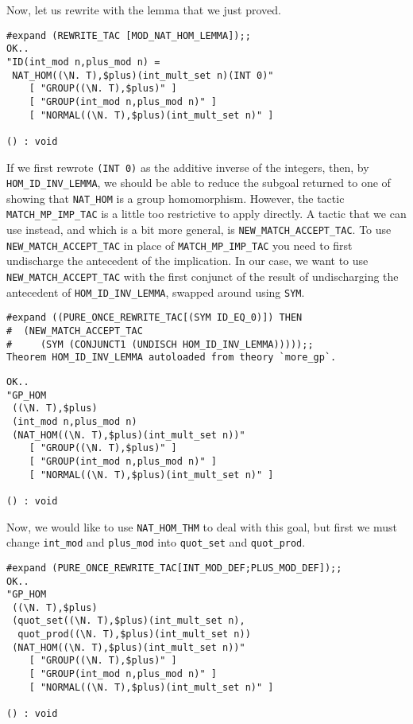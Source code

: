 Now, let us rewrite with the lemma that we just proved.
\begin{session}
\begin{verbatim}
#expand (REWRITE_TAC [MOD_NAT_HOM_LEMMA]);;
OK..
"ID(int_mod n,plus_mod n) =
 NAT_HOM((\N. T),$plus)(int_mult_set n)(INT 0)"
    [ "GROUP((\N. T),$plus)" ]
    [ "GROUP(int_mod n,plus_mod n)" ]
    [ "NORMAL((\N. T),$plus)(int_mult_set n)" ]

() : void
\end{verbatim}
\end{session}

If we first rewrote {\small\verb+(INT 0)+} as the additive inverse of
the integers, then, by {\small\verb+HOM_ID_INV_LEMMA+}, we should be
able to reduce the subgoal returned to one of showing that
{\small\verb+NAT_HOM+} is a group homomorphism.  However, the tactic
{\small\verb+MATCH_MP_IMP_TAC+} is a little too restrictive to apply
directly.  A tactic that we can use instead, and which is a bit more
general, is {\small\verb+NEW_MATCH_ACCEPT_TAC+}.  To use
{\small\verb+NEW_MATCH_ACCEPT_TAC+} in place of
{\small\verb+MATCH_MP_IMP_TAC+} you need to first undischarge the
antecedent of the implication.  In our case, we want to use
{\small\verb+NEW_MATCH_ACCEPT_TAC+} with the first conjunct of the
result of undischarging the antecedent of
{\small\verb+HOM_ID_INV_LEMMA+}, swapped around using {\small\verb+SYM+}. 
\begin{session}
\begin{verbatim}
#expand ((PURE_ONCE_REWRITE_TAC[(SYM ID_EQ_0)]) THEN
#  (NEW_MATCH_ACCEPT_TAC
#     (SYM (CONJUNCT1 (UNDISCH HOM_ID_INV_LEMMA)))));;
Theorem HOM_ID_INV_LEMMA autoloaded from theory `more_gp`.
\end{verbatim}
\mvdots
\begin{verbatim}
OK..
"GP_HOM
 ((\N. T),$plus)
 (int_mod n,plus_mod n)
 (NAT_HOM((\N. T),$plus)(int_mult_set n))"
    [ "GROUP((\N. T),$plus)" ]
    [ "GROUP(int_mod n,plus_mod n)" ]
    [ "NORMAL((\N. T),$plus)(int_mult_set n)" ]

() : void
\end{verbatim}
\end{session}

Now, we would like to use {\small\verb+NAT_HOM_THM+} to deal with this
goal, but first we must change {\small\verb+int_mod+} and
{\small\verb+plus_mod+} into {\small\verb+quot_set+} and
{\small\verb+quot_prod+}.
\begin{session}
\begin{verbatim}
#expand (PURE_ONCE_REWRITE_TAC[INT_MOD_DEF;PLUS_MOD_DEF]);;
OK..
"GP_HOM
 ((\N. T),$plus)
 (quot_set((\N. T),$plus)(int_mult_set n),
  quot_prod((\N. T),$plus)(int_mult_set n))
 (NAT_HOM((\N. T),$plus)(int_mult_set n))"
    [ "GROUP((\N. T),$plus)" ]
    [ "GROUP(int_mod n,plus_mod n)" ]
    [ "NORMAL((\N. T),$plus)(int_mult_set n)" ]

() : void
\end{verbatim}
\end{session}

